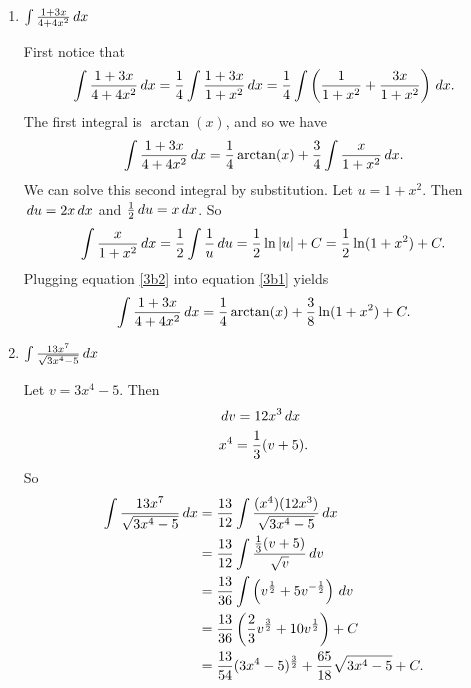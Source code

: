 \documentclass[handout,nooutcomes]{ximera}
\begin{document}
\begin{problem}
\begin{multicols}{2}
\begin{enumerate}
		
		
	\item  $ \int \frac{1+3x}{4+4x^2} \,d x$
		\begin{freeResponse}
		First notice that
			\begin{equation*}
			\int \frac{1+3x}{4+4x^2} \,d x = \frac{1}{4} \int \frac{1+3x}{1+x^2} \,d x = \frac{1}{4} \int \left( \frac{1}{1+x^2} + \frac{3x}{1+x^2} \right) \,d x.
			\end{equation*}
		The first integral is $\arctan(x)$, and so we have
			\begin{equation}\label{3b1}
			\int \frac{1+3x}{4+4x^2} \,d x = \frac{1}{4} \arctan(x) + \frac{3}{4} \int \frac{x}{1+x^2} \,d x.
			\end{equation}
		We can solve this second integral by substitution.  Let $u=1+x^2$.  Then $\,d u = 2x \,d x$ and $\frac{1}{2} \,d u = x \,d x$.  So
			\begin{equation}\label{3b2}
			\int \frac{x}{1+x^2} \,d x = \frac{1}{2} \int \frac{1}{u} \,d u = \frac{1}{2} \ln|u| +C = \frac{1}{2} \ln(1+x^2) + C.
			\end{equation}
		Plugging equation \eqref{3b2} into equation \eqref{3b1} yields
			\begin{equation*}
			\int \frac{1+3x}{4+4x^2} \,d x = \frac{1}{4} \arctan(x) + \frac{3}{8} \ln(1+x^2) + C.
			\end{equation*}
		\end{freeResponse}
		
		
	
	\item  $\int \frac{13x^7}{\sqrt{3x^4-5}} \,d x$
		\begin{freeResponse}
		Let $v = 3x^4 - 5$.  Then
			\begin{align*}
			&\,d v = 12 x^3 \,d x  \\
			&x^4 = \frac{1}{3} (v + 5).
			\end{align*}
		So
			\begin{align*}
			\int \frac{13x^7}{\sqrt{3x^4-5}} \,d x &= \frac{13}{12} \int \frac{(x^4)(12 x^3)}{\sqrt{3x^4-5}} \,d x  \\
			&= \frac{13}{12} \int \frac{\frac{1}{3} (v+5)}{\sqrt{v}} \,d v  \\
			&= \frac{13}{36} \int \left( v^{\frac{1}{2}} + 5v^{-\frac{1}{2}} \right) \,d v  \\
			&= \frac{13}{36} \left( \frac{2}{3} v^{\frac{3}{2}} + 10 v^{\frac{1}{2}} \right) + C  \\
			&= \frac{13}{54} (3x^4-5)^{\frac{3}{2}} + \frac{65}{18} \sqrt{3x^4 - 5} + C.
			\end{align*}
		\end{freeResponse}
		

\end{enumerate}
\end{multicols}
\end{problem}
\end{document}
